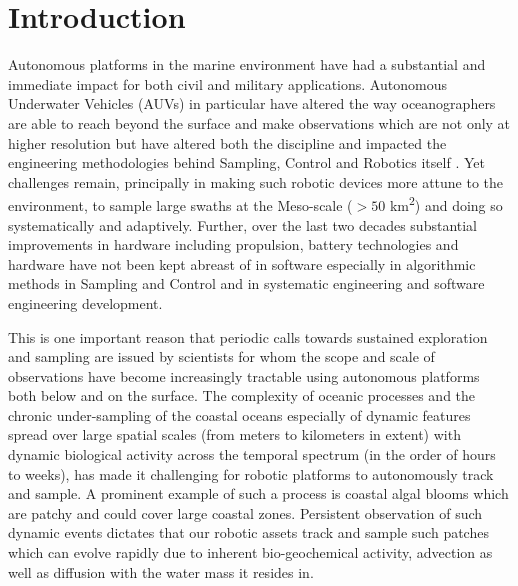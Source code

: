 \section{Introduction}
\label{sec:intro}


Autonomous platforms in the marine environment have had a substantial
and immediate impact for both civil and military
applications. Autonomous Underwater Vehicles (AUVs) in particular have
altered the way oceanographers are able to reach beyond the surface
and make observations which are not only at higher resolution but have
altered both the discipline and impacted the engineering methodologies
behind Sampling, Control and Robotics itself
\cite{Brierley08032002,ryan05,Thomas06,Yoerger01012007,Incze2009,Rigby10}. Yet
challenges remain, principally in making such robotic devices more
attune to the environment, to sample large swaths at the Meso-scale
($> 50$ km\textsuperscript{2}) and doing so systematically and
adaptively. Further, over the last two decades substantial
improvements in hardware including propulsion, battery technologies
and hardware have not been kept abreast of in software especially in
algorithmic methods in Sampling and Control and in systematic
engineering and software engineering development.

This is one important reason that periodic calls towards sustained
exploration and sampling \cite{rudnick03} are issued by scientists for
whom the scope and scale of observations have become increasingly
tractable using autonomous platforms both below and on the
surface. The complexity of oceanic processes and the chronic
under-sampling of the coastal oceans especially of dynamic features
spread over large spatial scales (from meters to kilometers in extent)
with dynamic biological activity across the temporal spectrum (in the
order of hours to weeks), has made it challenging for robotic
platforms to autonomously track and sample. A prominent example of
such a process is coastal algal blooms which are patchy and could
cover large coastal zones. Persistent observation of such dynamic
events dictates that our robotic assets track and sample such patches
which can evolve rapidly due to inherent bio-geochemical activity,
advection as well as diffusion with the water mass it resides in.

